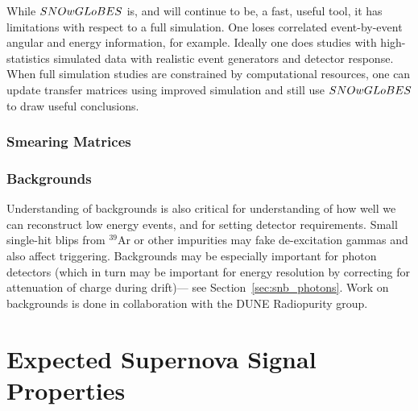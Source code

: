 While $SNOwGLoBES$ is, and will continue to be, a fast, useful tool,
it has limitations with respect to a full simulation.  One loses correlated
event-by-event angular and energy information, for example.
Ideally one does studies with high-statistics simulated data with
realistic event generators and detector response.
When full simulation studies are constrained by computational resources,
one can update transfer matrices using improved simulation and still use
$SNOwGLoBES$ to draw useful conclusions.


\subsubsection{Smearing Matrices }



\subsubsection{Backgrounds}

Understanding of backgrounds is also critical for understanding of how
well we can reconstruct low energy events, and for setting detector requirements.  Small single-hit blips
from $^{39}$Ar or other impurities may fake de-excitation gammas and also affect
triggering.  Backgrounds may be especially important for photon
detectors (which in turn may be important for energy resolution by
correcting for attenuation of charge during drift)--- see Section~\ref{sec:snb_photons}.  Work on
backgrounds is done in collaboration with the DUNE Radiopurity group.

\section{Expected Supernova Signal Properties}\label{sec:sn-signals}


